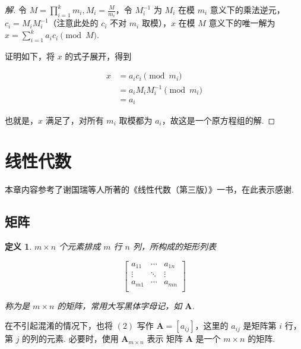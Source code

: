 \documentclass[a4paper]{article}
\newtheorem{definition}{定义}[section]
\begin{document}
\begin{proof}[解]
    令 $M=\prod\limits_{i=1}^k m_i,M_i=\frac{M}{m_i}$，令 $M_i^{-1}$ 为
    $M_i$ 在模 $m_i$ 意义下的乘法逆元，$c_i=M_iM_i^{-1}$（注意此处的 $c_i$ 不对 $m_i$
    取模），$x$ 在模 $M$ 意义下的唯一解为 $x=\sum\limits_{i=1}^k a_ic_i\pmod M$.

    证明如下，将 $x$ 的式子展开，得到

    \begin{equation*}
        \begin{split}
            x&=a_ic_i\pmod {m_i}\\
            &=a_iM_iM_i^{-1}\pmod {m_i}\\
            &=a_i
        \end{split}
    \end{equation*}

    也就是，$x$ 满足了，对所有 $m_i$ 取模都为 $a_i$，故这是一个原方程组的解.
\end{proof}

\newpage

\section{线性代数}

本章内容参考了谢国瑞等人所著的《线性代数（第三版）》一书，在此表示感谢.

\subsection{矩阵}

\begin{definition}
    $m\times n$ 个元素排成 $m$ 行 $n$ 列，所构成的矩形列表

    \begin{equation}
        \begin{bmatrix}
            a_{11} & \cdots & a_{1n} \\
            \vdots & \ddots & \vdots \\
            a_{m1} & \cdots & a_{mn} \\
        \end{bmatrix}
    \end{equation}

    称为是 $m\times n$ 的矩阵，常用大写黑体字母记，如 $\boldsymbol A$.
\end{definition}

在不引起混淆的情况下，也将 $(2)$ 写作 $\boldsymbol A=[a_{ij}]$，这里的 $a_{ij}$
是矩阵第 $i$ 行，第 $j$ 的列的元素. 必要时，使用 $\boldsymbol A_{m\times n}$ 表示
矩阵 $\boldsymbol A$ 是一个 $m\times n$ 的矩阵.
\end{document}
